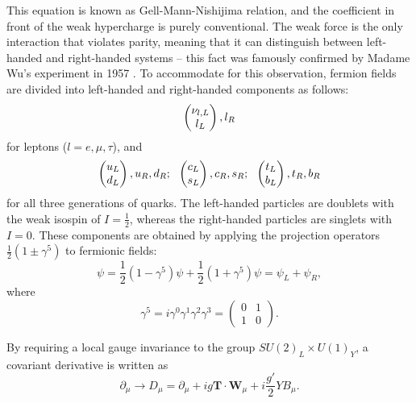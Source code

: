 This equation is known as Gell-Mann-Nishijima relation, and the coefficient in front of the weak hypercharge is purely
conventional. The weak force is the only interaction that violates parity, meaning that it can distinguish between
left-handed and right-handed systems -- this fact was famously confirmed by Madame Wu's experiment in 1957
\autocite{Madame_Wu}. To accommodate for this observation, fermion fields are divided into left-handed and right-handed
components as follows:
\begin{equation}
\begin{pmatrix} \nu_{l,L} \\ l_L \end{pmatrix}, l_R
\label{eq:lepton_EWK_fields}
\end{equation} 
for leptons ($l = e, \mu, \tau$), and
\begin{equation}
\begin{pmatrix} u_L \\ d_L \end{pmatrix}, u_R, d_R; ~~ \begin{pmatrix} c_L \\ s_L \end{pmatrix}, c_R, s_R; ~~ \begin{pmatrix} t_L \\ b_L \end{pmatrix}, t_R, b_R
\label{eq:quark_EWK_fields}
\end{equation} 
for all three generations of quarks. The left-handed particles are doublets with the weak isospin of $I = \frac{1}{2}$,
whereas the right-handed particles are singlets with $I = 0$. These components are obtained by applying the projection
operators $\frac{1}{2}(1\pm\gamma^5)$ to fermionic fields:
\begin{equation}
\psi = \frac{1}{2}(1-\gamma^5) \psi + \frac{1}{2}(1 + \gamma^5)\psi = \psi_L +  \psi_R,
\end{equation} 
where
\begin{equation}
\gamma^5 = i \gamma^0  \gamma^1  \gamma^2  \gamma^3 = \begin{pmatrix}
0 & 1\\
1 & 0
\end{pmatrix}.
\end{equation}

By requiring a local gauge invariance to the group $SU(2)_L \times U(1)_Y$, a covariant derivative is written as
\begin{equation}
\partial_\mu \rightarrow D_\mu = \partial_\mu + i g \mathbf{T} \cdot \mathbf{W}_\mu + i \frac{g'}{2} Y B_\mu.
\label{eq:D_mu_EWK}
\end{equation}

